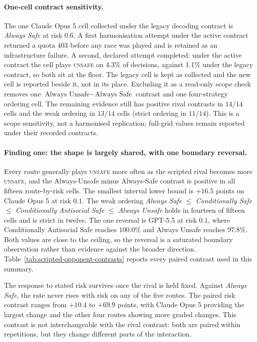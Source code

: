 \documentclass{article}
\newcommand{\Unsafe}{\textsc{unsafe}}
\begin{document}
\paragraph{One-cell contract sensitivity.} The one Claude Opus 5 cell collected
under the legacy decoding contract is \emph{Always Safe} at risk $0.6$. A
first harmonisation attempt under the active contract returned a quota 403
before any race was played and is retained as an infrastructure failure. A
second, declared attempt completed: under the active contract the cell plays
\Unsafe{} on 4.3\% of decisions, against 1.1\% under the legacy contract, so
both sit at the floor. The legacy cell is kept as collected and the new cell is
reported beside it, not in its place. Excluding it as a
read-only scope check removes one $\text{Always Unsafe} - \text{Always Safe}$
contrast and one four-strategy ordering cell. The remaining evidence still has
positive rival contrasts in $14/14$ cells and the weak ordering in $13/14$
cells (strict ordering in $11/14$). This is a scope sensitivity, not a
harmonised replication; full-grid values remain reported under their recorded
contracts.

\paragraph{Finding one: the shape is largely shared, with one boundary
reversal.} Every route generally plays \Unsafe{} more often as the scripted
rival becomes more \Unsafe{}, and the Always-Unsafe minus Always-Safe contrast
is positive in all fifteen route-by-risk cells. The smallest interval lower
bound is $+16.5$ points on Claude Opus 5 at risk $0.1$. The weak ordering
\emph{Always Safe} $\leq$ \emph{Conditionally Safe} $\leq$
\emph{Conditionally Antisocial Safe} $\leq$ \emph{Always Unsafe} holds in
fourteen of fifteen cells and is strict in twelve. The one reversal is GPT-5.5
at risk $0.1$, where Conditionally Antisocial Safe reaches $100.0\%$ and Always
Unsafe reaches
$97.8\%$. Both values are close to the ceiling, so the reversal is a
saturated boundary observation rather than evidence against the broader
direction. Table~\ref{tab:scripted-opponent-contrasts} reports every paired
contrast used in this summary.

The response to stated risk survives once the rival is held fixed. Against
\emph{Always Safe}, the rate never rises with risk on any of the five routes.
The paired risk contrast ranges from $+10.4$ to $+69.9$ points, with Claude
Opus 5 providing the largest change and the other four routes showing more
graded changes. This contrast is not interchangeable with the rival contrast:
both are paired within repetitions, but they change different parts of the
interaction.
\end{document}
